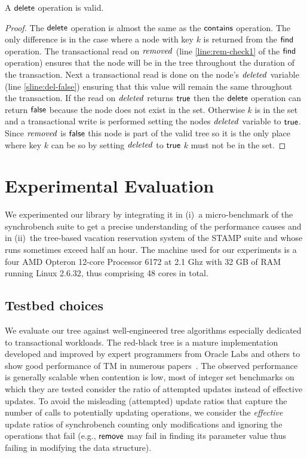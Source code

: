 \begin{theorem}
\label{theorem:delete-valid}
A $\act{delete}$ operation is valid.
\end{theorem}
\begin{proof}
The $\act{delete}$ operation is almost the same as the $\act{contains}$ operation.
The only difference is in the case where a node with key $k$ is returned from the $\act{find}$ operation.
The transactional read on $\ms{removed}$ (line \ref{line:rem-check1} of the $\act{find}$ operation) ensures that the node will be in the tree throughout the duration of the transaction.
Next a transactional read is done on the node's $\ms{deleted}$ variable (line \ref{sline:del-false}) ensuring that this value will remain the same throughout the transaction.
If the read on $\ms{deleted}$ returns $\lit{true}$ then the $\act{delete}$ operation can return $\lit{false}$ because the node does not exist in the set.
Otherwise $k$ is in the set and a transactional write is performed setting the nodes $\ms{deleted}$ variable to $\lit{true}$.
Since $\ms{removed}$ is $\lit{false}$ this node is part of the valid tree so it is the only place where key $k$ can be so by setting
$\ms{deleted}$ to $\lit{true}$ $k$ must not be in the set.
\end{proof}

\section{Experimental Evaluation}\label{sec:expe}
We experimented our library by integrating it in (i)~a micro-benchmark of the synchrobench suite %
to get a precise understanding of the performance causes and in (ii)~the tree-based vacation 
reservation system of the STAMP suite 
and whose
runs sometimes exceed half an hour.
The machine used for our experiments is a four AMD Opteron 12-core Processor 6172 at 2.1 Ghz with 32 GB of RAM running Linux 2.6.32, thus comprising 48 cores in total.

\subsection{Testbed choices}
We evaluate our tree against well-engineered 
tree algorithms especially dedicated to transactional workloads.
%
The red-black tree is a mature implementation developed and improved by expert programmers from Oracle Labs and 
others to show good performance of TM in numerous papers~\cite{DSS06,HLMS03,CCKO08,HK08,FFR08,YNW+08,DFGG11}.
The observed performance is generally scalable when contention is low, most of integer set benchmarks on which they are tested 
consider the ratio of attempted updates instead of effective updates. 
To avoid the misleading (attempted) update ratios that capture the number of calls to potentially updating operations, we consider the \emph{effective} update ratios of synchrobench 
counting only modifications and ignoring the operations that fail (e.g., $\act{remove}$ may fail in finding its parameter value thus failing in modifying the data structure).


